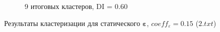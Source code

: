 \begin{figure}[!htb]
\begin{subfigure}[!htb]{0.8\textwidth}
		\caption{9 итоговых кластеров, DI = 0.60}
		\label{fig:2-9cl-015}
	\end{subfigure}
	\caption{Результаты кластеризации для статического $\bm{\varepsilon}$, $coeff_\varepsilon = 0.15$ ($2.txt$)}
	\label{fig:clust-res-2-015}
\end{figure}
